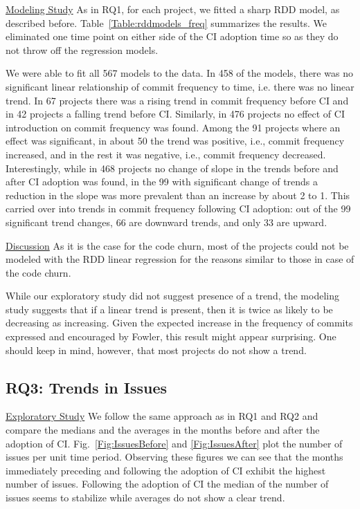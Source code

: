 \noindent \underline{Modeling Study} 
As in RQ1, for each project, we fitted a sharp RDD model, as described before.
Table~\ref{Table:rddmodels_freq} summarizes the results.
We eliminated one time point on either side of the CI adoption time so as they do not throw off the regression models.


We were able to fit all 567 models to the data.
In 458 of the models, there was no significant linear relationship of commit frequency to time, i.e. there was no linear trend.
In 67 projects there was a rising trend in commit frequency before CI and in 42 projects a falling trend before CI.
Similarly, in 476 projects no effect of CI introduction on commit frequency was found. Among the 91 projects where an effect was significant, in about 50 the trend was positive, i.e., commit frequency increased, and in the rest it was negative, i.e., commit frequency decreased.
Interestingly, while in 468 projects no change of slope in the trends before and after CI adoption was found, in the 99 with significant change of trends a reduction in the slope was more prevalent than an increase by about 2 to 1.
This carried over into trends in commit frequency following CI adoption: out of the 99 significant trend changes, 66 are downward trends, and only 33 are upward.

\noindent \underline{Discussion}
As it is the case for the code churn, most of the projects could not be modeled with the RDD linear regression for 
the reasons similar to those in case of the code churn.

While our exploratory study did not suggest presence of a trend, the modeling study suggests that if a linear 
trend is present, then it is twice as likely to be decreasing as increasing. 
Given the expected increase in the frequency of commits expressed and encouraged by Fowler, this result might appear surprising.
One should keep in mind, however, that most projects do not show a trend.




\subsection{RQ3: Trends in Issues}

\noindent \underline{Exploratory Study}
We follow the same approach as in RQ1 and RQ2 and compare the medians and the averages in the months
before and after the adoption of CI.
Fig.~\ref{Fig:IssuesBefore} and \ref{Fig:IssuesAfter} plot the number of issues per unit time period.
Observing these figures we can see that the months immediately 
preceding and following the adoption of CI exhibit the highest number of issues.
Following the adoption of CI the median of the number of issues seems to stabilize while averages do
not show a clear trend. 

